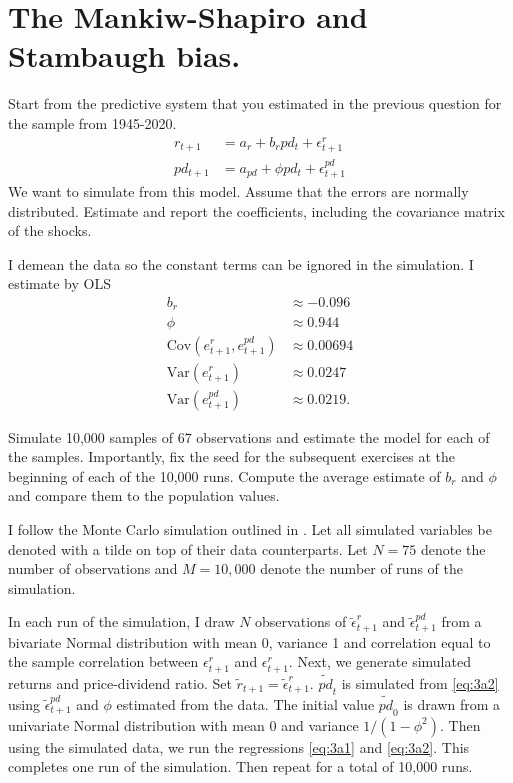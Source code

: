 \section{The Mankiw-Shapiro and Stambaugh bias.}


\begin{answer}[Part a]
Start from the predictive system that you estimated in the previous question for the sample from 1945-2020.
\begin{align}
r_{t+1} &= a_r + b_r pd_t + \epsilon_{t+1}^r \label{eq:3a1}\\
pd_{t+1} &= a_{pd} + \phi pd_t + \epsilon_{t+1}^{pd} \label{eq:3a2}
\end{align}
We want to simulate from this model. Assume that the errors are normally distributed. Estimate and report the coefficients, including the covariance matrix of the shocks.
\end{answer}
I demean the data so the constant terms can be ignored in the simulation. I estimate by OLS
\begin{align}
b_r &\approx -0.096 \\
\phi &\approx 0.944 \\
\text{Cov}(e_{t+1}^r , e_{t+1}^{pd} ) &\approx 0.00694 \\
\text{Var}(e_{t+1}^r) &\approx 0.0247 \\
\text{Var}(e_{t+1}^{pd}) &\approx 0.0219.
\end{align}





\begin{answer}[Part b]
Simulate 10,000 samples of 67 observations and estimate the model for each of the samples. Importantly, fix the seed for the subsequent exercises at the beginning of each of the 10,000 runs. Compute the average estimate of $b_r$ and $\phi$ and compare them to the population values.
\end{answer}
I follow the Monte Carlo simulation outlined in \cite{mankiwshapiro1986}. Let all simulated variables be denoted with a tilde on top of their data counterparts. Let $N=75$ denote the number of observations and $M=10,000$ denote the number of runs of the simulation.

In each run of the simulation, I draw $N$ observations of $\tilde{\epsilon}^r_{t+1}$ and $\tilde{\epsilon}^{pd}_{t+1}$ from a bivariate Normal distribution with mean 0, variance 1 and correlation equal to the sample correlation between $\epsilon^r_{t+1}$ and $\epsilon^r_{t+1}$. Next, we generate simulated returns and price-dividend ratio. Set $\tilde{r}_{t+1} = \tilde{\epsilon}^r_{t+1}$. $\tilde{pd}_t$ is simulated from \eqref{eq:3a2} using $\tilde{\epsilon}^{pd}_{t+1}$ and $\phi$ estimated from the data. The initial value $\tilde{pd}_0$ is drawn from a univariate Normal distribution with mean 0 and variance $1/(1-\phi^2)$. Then using the simulated data, we run the regressions \eqref{eq:3a1} and \eqref{eq:3a2}. This completes one run of the simulation. Then repeat for a total of 10,000 runs.

